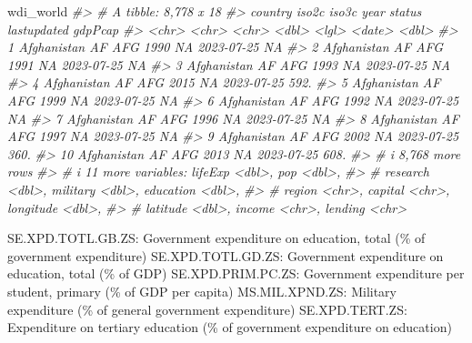 \documentclass[
  xelatex, ja=standard]{bxjsbook}
\newenvironment{Shaded}{\begin{snugshade}}{\end{snugshade}}
\newcommand{\CommentTok}[1]{\textcolor[rgb]{0.56,0.35,0.01}{\textit{#1}}}
\newcommand{\NormalTok}[1]{#1}
\theoremstyle{definition}
\theoremstyle{definition}
\theoremstyle{definition}
\theoremstyle{definition}
\theoremstyle{remark}
\begin{document}
\begin{Shaded}
\begin{Highlighting}[]
\NormalTok{wdi\_world}
\CommentTok{\#\textgreater{} \# A tibble: 8,778 x 18}
\CommentTok{\#\textgreater{}    country     iso2c iso3c  year status lastupdated gdpPcap}
\CommentTok{\#\textgreater{}    \textless{}chr\textgreater{}       \textless{}chr\textgreater{} \textless{}chr\textgreater{} \textless{}dbl\textgreater{} \textless{}lgl\textgreater{}  \textless{}date\textgreater{}        \textless{}dbl\textgreater{}}
\CommentTok{\#\textgreater{}  1 Afghanistan AF    AFG    1990 NA     2023{-}07{-}25      NA }
\CommentTok{\#\textgreater{}  2 Afghanistan AF    AFG    1991 NA     2023{-}07{-}25      NA }
\CommentTok{\#\textgreater{}  3 Afghanistan AF    AFG    1993 NA     2023{-}07{-}25      NA }
\CommentTok{\#\textgreater{}  4 Afghanistan AF    AFG    2015 NA     2023{-}07{-}25     592.}
\CommentTok{\#\textgreater{}  5 Afghanistan AF    AFG    1999 NA     2023{-}07{-}25      NA }
\CommentTok{\#\textgreater{}  6 Afghanistan AF    AFG    1992 NA     2023{-}07{-}25      NA }
\CommentTok{\#\textgreater{}  7 Afghanistan AF    AFG    1996 NA     2023{-}07{-}25      NA }
\CommentTok{\#\textgreater{}  8 Afghanistan AF    AFG    1997 NA     2023{-}07{-}25      NA }
\CommentTok{\#\textgreater{}  9 Afghanistan AF    AFG    2002 NA     2023{-}07{-}25     360.}
\CommentTok{\#\textgreater{} 10 Afghanistan AF    AFG    2013 NA     2023{-}07{-}25     608.}
\CommentTok{\#\textgreater{} \# i 8,768 more rows}
\CommentTok{\#\textgreater{} \# i 11 more variables: lifeExp \textless{}dbl\textgreater{}, pop \textless{}dbl\textgreater{},}
\CommentTok{\#\textgreater{} \#   research \textless{}dbl\textgreater{}, military \textless{}dbl\textgreater{}, education \textless{}dbl\textgreater{},}
\CommentTok{\#\textgreater{} \#   region \textless{}chr\textgreater{}, capital \textless{}chr\textgreater{}, longitude \textless{}dbl\textgreater{},}
\CommentTok{\#\textgreater{} \#   latitude \textless{}dbl\textgreater{}, income \textless{}chr\textgreater{}, lending \textless{}chr\textgreater{}}
\end{Highlighting}
\end{Shaded}

SE.XPD.TOTL.GB.ZS: Government expenditure on education, total (\% of government expenditure) SE.XPD.TOTL.GD.ZS: Government expenditure on education, total (\% of GDP) SE.XPD.PRIM.PC.ZS: Government expenditure per student, primary (\% of GDP per capita) MS.MIL.XPND.ZS: Military expenditure (\% of general government expenditure) SE.XPD.TERT.ZS: Expenditure on tertiary education (\% of government expenditure on education)
\end{document}
